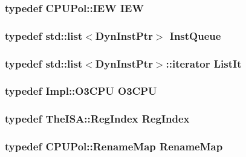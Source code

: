 \label{classDefaultRename_ab784c356bacd490590fba42443e0f786}
\hypertarget{classDefaultRename_a2e298f790f528754f0e0ffa0cb8088f6}{
\subsubsection[{IEW}]{\setlength{\rightskip}{0pt plus 5cm}typedef CPUPol::IEW {\bf IEW}}}
\label{classDefaultRename_a2e298f790f528754f0e0ffa0cb8088f6}
\hypertarget{classDefaultRename_adba1ac227fff8c6f9b17ded2fb270e77}{
\subsubsection[{InstQueue}]{\setlength{\rightskip}{0pt plus 5cm}typedef {\bf std::list}$<${\bf DynInstPtr}$>$ {\bf InstQueue}}}
\label{classDefaultRename_adba1ac227fff8c6f9b17ded2fb270e77}
\hypertarget{classDefaultRename_a184cb829e22cc656acb41864f68f51ea}{
\subsubsection[{ListIt}]{\setlength{\rightskip}{0pt plus 5cm}typedef {\bf std::list}$<${\bf DynInstPtr}$>$::iterator {\bf ListIt}}}
\label{classDefaultRename_a184cb829e22cc656acb41864f68f51ea}
\hypertarget{classDefaultRename_a44622cf06940413482836cb62931ac3f}{
\subsubsection[{O3CPU}]{\setlength{\rightskip}{0pt plus 5cm}typedef Impl::O3CPU {\bf O3CPU}}}
\label{classDefaultRename_a44622cf06940413482836cb62931ac3f}
\hypertarget{classDefaultRename_a36d25e03e43fa3bb4c5482cbefe5e0fb}{
\subsubsection[{RegIndex}]{\setlength{\rightskip}{0pt plus 5cm}typedef TheISA::RegIndex {\bf RegIndex}}}
\label{classDefaultRename_a36d25e03e43fa3bb4c5482cbefe5e0fb}
\hypertarget{classDefaultRename_a341963bcea1928476182a17e357f98e3}{
\subsubsection[{RenameMap}]{\setlength{\rightskip}{0pt plus 5cm}typedef CPUPol::RenameMap {\bf RenameMap}}}

